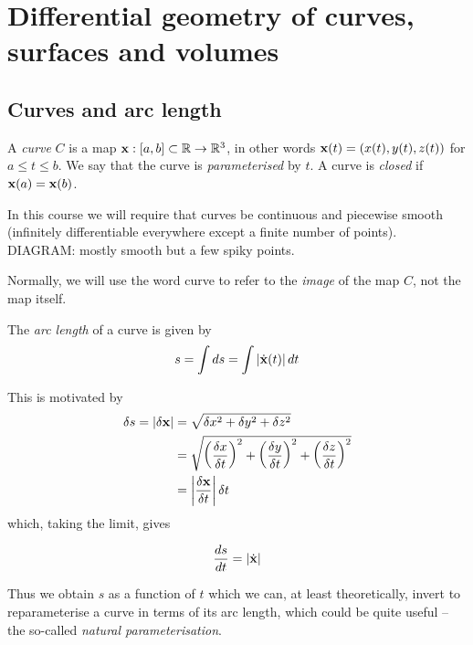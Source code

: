 \documentclass{../template/note}
\begin{document}
    \section{Differential geometry of curves, surfaces and volumes}

    \subsection{Curves and arc length}

    \begin{definition*}
        A \emph{curve} \(C\) is a map \(\V x: [a, b] \subset \RR \to \RR^3\), in other words \(\V x(t) = (x(t), y(t), z(t))\) for \(a \leq t \leq b\). We say that the curve is \emph{parameterised} by \(t\). A curve is \emph{closed} if \(\V x(a) = \V x(b)\).
    \end{definition*}
    
    In this course we will require that curves be continuous and piecewise smooth (infinitely differentiable everywhere except a finite number of points). DIAGRAM: mostly smooth but a few spiky points.

    Normally, we will use the word curve to refer to the \emph{image} of the map \(C\), not the map itself.

    \begin{definition*}
        The \emph{arc length} of a curve is given by
        \begin{align*}
            s = \int ds = \int |\dot{\V x}(t)| \D t
        \end{align*}        
    \end{definition*}
    This is motivated by
    \begin{align*}
        \delta s = |\delta \V x| &= \sqrt{\delta x^2 + \delta y^2 + \delta z^2} \\
        &= \sqrt{\left(\frac{\delta x}{\delta t}\right)^2+\left(\frac{\delta y}{\delta t}\right)^2+\left(\frac{\delta z}{\delta t}\right)^2} \\
        &= \left|\frac{\delta \V x}{\delta t}\right|\delta t
    \end{align*}
    which, taking the limit, gives
    \begin{proposition}
        \label{4.1 }\[
            \frac{ds}{dt} = |\dot{\V x}|
        \]
    \end{proposition}
    
    Thus we obtain \(s\) as a function of \(t\) which we can, at least theoretically, invert to reparameterise a curve in terms of its arc length, which could be quite useful -- the so-called \emph{natural parameterisation}.
    
\end{document}
